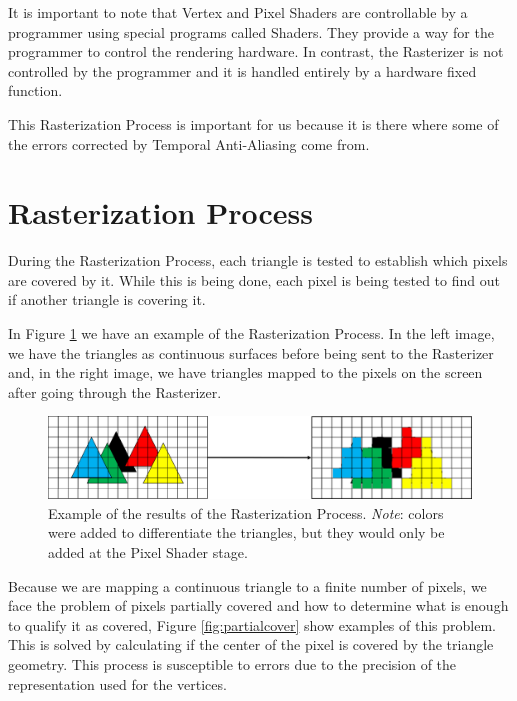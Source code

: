 \documentclass{cslthse-msc}
\begin{document}
It is important to note that Vertex and Pixel Shaders are controllable by a programmer using special programs called Shaders. They provide a way for the programmer to control the rendering hardware. In contrast, the Rasterizer is not controlled by the programmer and it is handled entirely by a hardware fixed function. \cite{Doggett2017EDAF80}

This Rasterization Process is important for us because it is there where some of the errors corrected by Temporal Anti-Aliasing come from.

\section{Rasterization Process}
During the Rasterization Process, each triangle is tested to establish which pixels are covered by it. While this is being done, each pixel is being tested to find out if another triangle is covering it.

In Figure \ref{fig:rasterizationproc} we have an example of the Rasterization Process. In the left image, we have the triangles as continuous surfaces before being sent to the Rasterizer and, in the right image, we have triangles mapped to the pixels on the screen after going through the Rasterizer.

\begin{figure}[!hbt]
	\centering
	\includegraphics[scale=0.75]{images/rasterization_process.png} 
	\caption{Example of the results of the Rasterization Process. 
		\emph{Note}: colors were added to differentiate the triangles, but they would only be added at the Pixel Shader stage.
	}\label{fig:rasterizationproc}
\end{figure}

Because we are mapping a continuous triangle to a finite number of pixels, we face the problem of pixels partially covered and how to determine what is enough to qualify it as covered, Figure \ref{fig:partialcover} show examples of this problem. This is solved by calculating if the center of the pixel is covered by the triangle geometry. This process is susceptible to errors due to the precision of the representation used for the vertices.  
\end{document}
